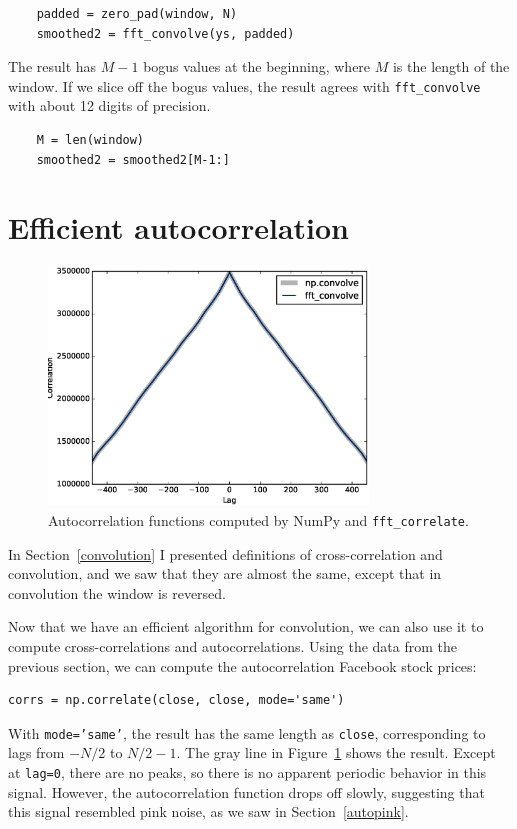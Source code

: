 \documentclass[12pt]{book}
\begin{document}
\begin{verbatim}
    padded = zero_pad(window, N)
    smoothed2 = fft_convolve(ys, padded)
\end{verbatim}

The result has $M-1$ bogus values at the beginning, where $M$ is the
length of the window.  If we slice off the bogus values, the result
agrees with \verb"fft_convolve" with about 12 digits of precision.

\begin{verbatim}
    M = len(window)
    smoothed2 = smoothed2[M-1:]
\end{verbatim}


\section{Efficient autocorrelation}

\begin{figure}
\centerline{\includegraphics[height=2.5in]{figs/convolution9.eps}}
\caption{Autocorrelation functions computed by NumPy and
  {\tt fft\_correlate}.}
\label{fig.convolution9}
\end{figure}

In Section~\ref{convolution} I presented definitions of
cross-correlation and convolution, and we saw that they are
almost the same, except that in convolution the window is
reversed.

Now that we have an efficient algorithm for convolution, we
can also use it to compute cross-correlations and autocorrelations.
Using the data from the previous section, we can compute the
autocorrelation Facebook stock prices:

\begin{verbatim}
corrs = np.correlate(close, close, mode='same')
\end{verbatim}

With {\tt mode='same'}, the result has the same length as {\tt close},
corresponding to lags from $-N/2$ to $N/2-1$.  
The gray line in Figure~\ref{fig.convolution9} shows the result.
Except at {\tt lag=0}, there are no peaks, so there is no apparent
periodic behavior in this signal.  However, the autocorrelation
function drops off slowly, suggesting that this signal resembled
pink noise, as we saw in Section~\ref{autopink}.
\end{document}
